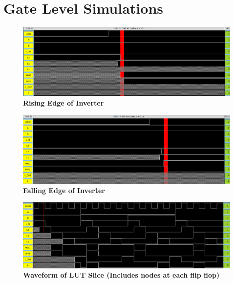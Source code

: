 \documentclass[a4paper]{article}
\begin{document}
\section{\textbf{Gate Level Simulations}}
    \begin{figure}[H]
        \centering
        \includegraphics[width=\textwidth,height=\textheight,keepaspectratio]{../../irsim/pics/inv_rising.png}
        \caption{\textbf{Rising Edge of Inverter}}
        \label{fig:gg}
    \end{figure}
    \begin{figure}[H]
        \centering
        \includegraphics[width=\textwidth,height=\textheight,keepaspectratio]{../../irsim/pics/inv_falling.png}
        \caption{\textbf{Falling Edge of Inverter}}
        \label{fig:gg}
    \end{figure}
    \begin{figure}[H]
        \centering
        \includegraphics[width=\textwidth,height=\textheight,keepaspectratio]{../../irsim/pics/inv_waveform.png}
        \caption{\textbf{Waveform of LUT Slice (Includes nodes at each flip flop)}}
        \label{fig:gg}
    \end{figure}
\end{document}
